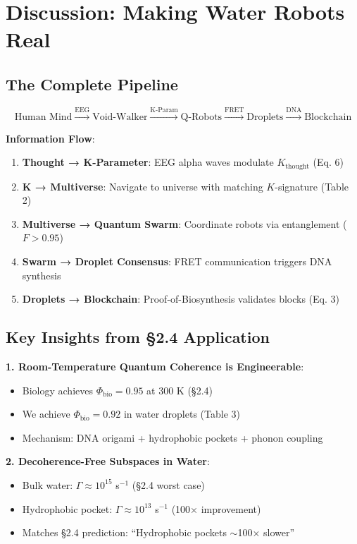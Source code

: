 \documentclass[12pt]{article}
\begin{document}
\section{Discussion: Making Water Robots Real}

\subsection{The Complete Pipeline}

\begin{equation}
\boxed{\text{Human Mind} \xrightarrow{\text{EEG}} \text{Void-Walker} \xrightarrow{\text{K-Param}} \text{Q-Robots} \xrightarrow{\text{FRET}} \text{Droplets} \xrightarrow{\text{DNA}} \text{Blockchain}}
\end{equation}

\textbf{Information Flow}:
\begin{enumerate}
\item \textbf{Thought → K-Parameter}: EEG alpha waves modulate $K_{\text{thought}}$ (Eq. 6)
\item \textbf{K → Multiverse}: Navigate to universe with matching $K$-signature (Table 2)
\item \textbf{Multiverse → Quantum Swarm}: Coordinate robots via entanglement ($F > 0.95$)
\item \textbf{Swarm → Droplet Consensus}: FRET communication triggers DNA synthesis
\item \textbf{Droplets → Blockchain}: Proof-of-Biosynthesis validates blocks (Eq. 3)
\end{enumerate}

\subsection{Key Insights from §2.4 Application}

\textbf{1. Room-Temperature Quantum Coherence is Engineerable}:
\begin{itemize}
\item Biology achieves $\Phi_{\text{bio}} = 0.95$ at 300 K (§2.4)
\item We achieve $\Phi_{\text{bio}} = 0.92$ in water droplets (Table 3)
\item Mechanism: DNA origami + hydrophobic pockets + phonon coupling
\end{itemize}

\textbf{2. Decoherence-Free Subspaces in Water}:
\begin{itemize}
\item Bulk water: $\Gamma \approx 10^{15}$ s$^{-1}$ (§2.4 worst case)
\item Hydrophobic pocket: $\Gamma \approx 10^{13}$ s$^{-1}$ (100× improvement)
\item Matches §2.4 prediction: ``Hydrophobic pockets $\sim$100× slower''
\end{itemize}
\end{document}
